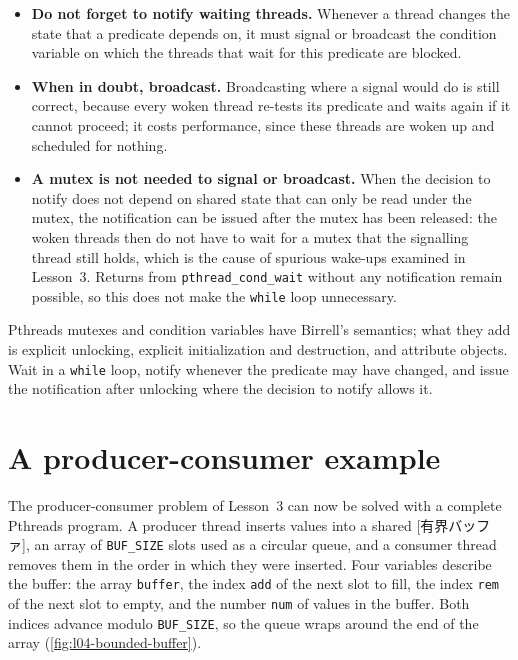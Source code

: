 \documentclass[../main.tex]{subfiles}
\begin{document}
\begin{itemize}
  \item \textbf{Do not forget to notify waiting threads.}  Whenever a thread
    changes the state that a predicate depends on, it must signal or
    broadcast the condition variable on which the threads that wait for
    this predicate are blocked.
  \item \textbf{When in doubt, broadcast.}  Broadcasting where a signal
    would do is still correct, because every woken thread re-tests its
    predicate and waits again if it cannot proceed; it costs performance,
    since these threads are woken up and scheduled for
    nothing.
  \item \textbf{A mutex is not needed to signal or broadcast.}  When the
    decision to notify does not depend on shared state that can only be read
    under the mutex, the notification can be issued after the mutex has been
    released: the woken threads then do not have to wait for a mutex that
    the signalling thread still holds, which is the cause of spurious
    wake-ups examined in Lesson~3.  Returns from
    \texttt{pthread\_cond\_wait} without any notification remain possible,
    so this does not make the \texttt{while} loop unnecessary.
\end{itemize}

\begin{keypoint}
  Pthreads mutexes and condition variables have Birrell's semantics; what
  they add is explicit unlocking, explicit initialization and destruction,
  and attribute objects.  Wait in a \texttt{while} loop, notify whenever
  the predicate may have changed, and issue the notification after
  unlocking where the decision to notify allows it.
\end{keypoint}

\section{A producer-consumer example}
\label{sec:l04-prodcons}

The producer-consumer problem of Lesson~3 can now be solved with a complete
Pthreads program.  A producer thread
inserts values into a shared [有界バッファ], an array of
\texttt{BUF\_SIZE} slots used as a circular queue, and a consumer thread
removes them in the order in which they were inserted.  Four variables
describe the buffer: the array \texttt{buffer}, the index \texttt{add} of the
next slot to fill, the index \texttt{rem} of the next slot to empty, and the
number \texttt{num} of values in the buffer.
Both indices advance modulo
\texttt{BUF\_SIZE}, so the queue wraps around the end of the array
(\cref{fig:l04-bounded-buffer}).
\end{document}
